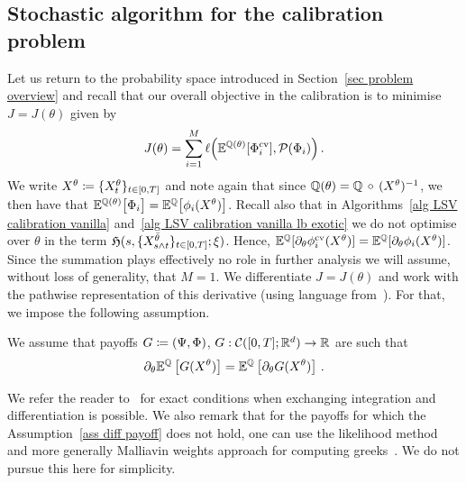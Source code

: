 \subsection{Stochastic algorithm for the calibration problem}
\label{sec stoch alg for calibration}
Let us return to the probability space introduced in Section~\ref{sec problem overview} and
recall that our overall objective in the calibration is to minimise $J=J(\theta)$ given by
\[
J(\theta) = \sum_{i=1}^M \ell\Big(\mathbb{E}^{\mathbb{Q}(\theta)}[\Phi_i^{\textup{cv}}], \mathcal{P}(\Phi_i)\Big)\,.
\]	
We write $X^{\theta}\coloneqq \{X_t^{\theta}\}_{t\in[0,T]}$ and note again that since $\mathbb{Q}(\theta)=\mathbb{Q}\, \circ\,(X^\theta)^{-1}$, we then have that $\mathbb{E}^{\mathbb{Q}(\theta)} \big[ \Phi_i \big] = \mathbb{E}^{\mathbb{Q}} \big[ \phi_i(X^\theta) \big]$.  
Recall also that in Algorithms~\ref{alg LSV calibration vanilla} and~\ref{alg LSV calibration vanilla lb exotic} we do not optimise over $\theta$ in the term $\mathfrak{H}(s,\{X_{s\wedge t}^{\bar \theta}\}_{t\in[0,T]};\xi)$.
Hence, ${\mathbb{E}^{\mathbb{Q}}[\partial_\theta \phi^{\textup{cv}}_i(X^{\theta})]=\mathbb{E}^{\mathbb{Q}}[\partial_\theta \phi_i(X^{\theta})]}$.
Since the summation plays effectively no role in further analysis we will assume, without loss of generality, that $M = 1$.
We differentiate $J = J(\theta)$ and work with the pathwise representation of this derivative (using language from~\cite{Glasserman2013MonteEngineering}). For that, we impose the following assumption.     

\begin{assumption}\label{ass diff payoff}
We assume that payoffs $G\coloneqq(\Psi,\Phi)$, $G:\mathcal{C}([0,T];\mathbb{R}^d) \to \mathbb{R}$ are such that 
\[
\partial_{\theta} \mathbb{E}^{\mathbb{Q}}\left[ G(X^{\theta}) \right] = 
 \mathbb{E}^{\mathbb{Q}}\left[ \partial_{\theta} G(X^{\theta}) \right]\,. 
\]
\end{assumption}
We refer the reader to~\cite[Chapter~7]{Glasserman2013MonteEngineering} for exact conditions when exchanging integration and differentiation is possible. We also remark that for the payoffs for which the Assumption~\ref{ass diff payoff} does not hold, one can use the likelihood method and more generally Malliavin weights approach for computing greeks~\cite{Fournie1999ApplicationsFinance}. 
We do not pursue this here for simplicity. 

